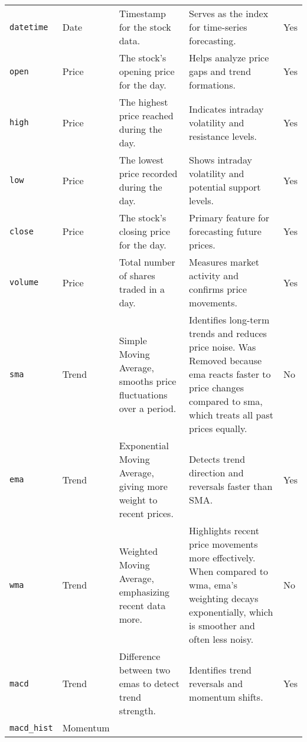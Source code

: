 \begin{landscape}
\begin{longtable}{llp{8cm}p{8cm}p{1.5cm}}
    \hline
    \endlastfoot
        \texttt{datetime} 
        & Date 
        & Timestamp for the stock data. 
        & Serves as the index for time-series forecasting.
        & Yes
        \\
        \texttt{open} 
        & Price  
        & The stock's opening price for the day. 
        & Helps analyze price gaps and trend formations. 
        & Yes
        \\
        \texttt{high} 
        & Price 
        & The highest price reached during the day. 
        & Indicates intraday volatility and resistance levels.
        & Yes
        \\
        \texttt{low} 
        & Price 
        & The lowest price recorded during the day. 
        & Shows intraday volatility and potential support levels. 
        & Yes
        \\
        \texttt{close} 
        & Price 
        & The stock's closing price for the day. 
        & Primary feature for forecasting future prices. 
        & Yes 
        \\
        \texttt{volume} 
        & Price 
        & Total number of shares traded in a day. 
        & Measures market activity and confirms price movements. 
        & Yes
        \\ \rowcolor{lightgray}
        \texttt{sma} 
        & Trend 
        & Simple Moving Average, smooths price fluctuations over a period. 
        & Identifies long-term trends and reduces price noise. 
        Was Removed because ema reacts faster to price changes compared to sma, which treats all past prices equally.
        & No 
        \\
        \texttt{ema} 
        & Trend 
        & Exponential Moving Average, giving more weight to recent prices. 
        & Detects trend direction and reversals faster than SMA. 
        & Yes
        \\ \rowcolor{lightgray}
        \texttt{wma} 
        & Trend 
        & Weighted Moving Average, emphasizing recent data more. 
        & Highlights recent price movements more effectively. When
          compared to wma, ema’s weighting decays exponentially, which is smoother and often less noisy.
        & No
        \\
        \texttt{macd} 
        & Trend 
        & Difference between two emas to detect trend strength. 
        & Identifies trend reversals and momentum shifts. 
        & Yes
        \\
        \texttt{macd\_hist} 
        & Momentum 

\end{longtable}
\end{landscape}

